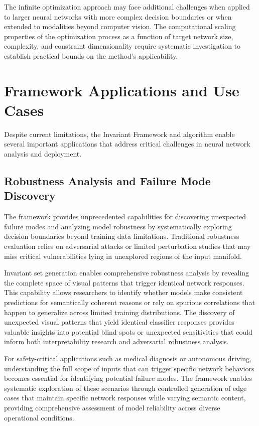 The infinite optimization approach may face additional challenges when applied to larger neural networks with more complex decision boundaries or when extended to modalities beyond computer vision. The computational scaling properties of the optimization process as a function of target network size, complexity, and constraint dimensionality require systematic investigation to establish practical bounds on the method's applicability.

\section{Framework Applications and Use Cases}

Despite current limitations, the Invariant Framework and \method{} algorithm enable several important applications that address critical challenges in neural network analysis and deployment.

\subsection{Robustness Analysis and Failure Mode Discovery}

The framework provides unprecedented capabilities for discovering unexpected failure modes and analyzing model robustness by systematically exploring decision boundaries beyond training data limitations. Traditional robustness evaluation relies on adversarial attacks or limited perturbation studies that may miss critical vulnerabilities lying in unexplored regions of the input manifold.

Invariant set generation enables comprehensive robustness analysis by revealing the complete space of visual patterns that trigger identical network responses. This capability allows researchers to identify whether models make consistent predictions for semantically coherent reasons or rely on spurious correlations that happen to generalize across limited training distributions. The discovery of unexpected visual patterns that yield identical classifier responses provides valuable insights into potential blind spots or unexpected sensitivities that could inform both interpretability research and adversarial robustness analysis.

For safety-critical applications such as medical diagnosis or autonomous driving, understanding the full scope of inputs that can trigger specific network behaviors becomes essential for identifying potential failure modes. The framework enables systematic exploration of these scenarios through controlled generation of edge cases that maintain specific network responses while varying semantic content, providing comprehensive assessment of model reliability across diverse operational conditions.

